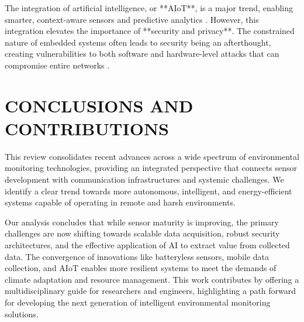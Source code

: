 The integration of artificial intelligence, or **AIoT**, is a major trend, enabling smarter, context-aware sensors and predictive analytics \cite{ghosh_2018_artificial, mukhopadhyay_2021_artificial}. However, this integration elevates the importance of **security and privacy**. The constrained nature of embedded systems often leads to security being an afterthought, creating vulnerabilities to both software and hardware-level attacks that can compromise entire networks \cite{pimentel_2017_exploring, koulamas_2018_realtime, fournaris_2017_exploiting}.

\section{CONCLUSIONS AND CONTRIBUTIONS}
This review consolidates recent advances across a wide spectrum of environmental monitoring technologies, providing an integrated perspective that connects sensor development with communication infrastructures and systemic challenges. We identify a clear trend towards more autonomous, intelligent, and energy-efficient systems capable of operating in remote and harsh environments.

Our analysis concludes that while sensor maturity is improving, the primary challenges are now shifting towards scalable data acquisition, robust security architectures, and the effective application of AI to extract value from collected data. The convergence of innovations like batteryless sensors, mobile data collection, and AIoT enables more resilient systems to meet the demands of climate adaptation and resource management. This work contributes by offering a multidisciplinary guide for researchers and engineers, highlighting a path forward for developing the next generation of intelligent environmental monitoring solutions.

